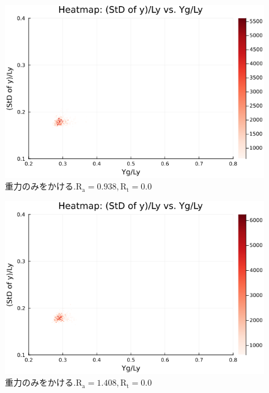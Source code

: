 \begin{figure}[H]
  \centering
  \includegraphics[scale=0.6]{image/dT0_heat/2024-01-15T14:30:46.968_mapg0_chi0_Ay50_rho0.4_T0.43_dT0.0_Rd0.0_Rt0.0_Ra0.938769_g0.0003999718779659611_run4.0e7.png}
  \caption{$重力のみをかける. \text{R}_\text{a}=0.938,\text{R}_\text{t}=0.0$}
  \label{}
\end{figure}

\begin{figure}[H]
  \centering
  \includegraphics[scale=0.6]{image/dT0_heat/2024-01-15T14:30:47.037_mapg0_chi0_Ay50_rho0.4_T0.43_dT0.0_Rd0.0_Rt0.0_Ra1.4081535_g0.0003999718779659611_run4.0e7.png}
  \caption{$重力のみをかける. \text{R}_\text{a}=1.408,\text{R}_\text{t}=0.0$}
  \label{}
\end{figure}


